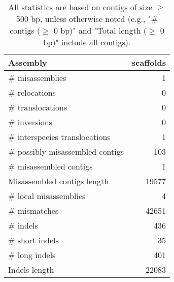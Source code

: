 \documentclass[12pt,a4paper]{article}
\begin{document}
\begin{table}[ht]
\begin{center}
\caption{All statistics are based on contigs of size $\geq$ 500 bp, unless otherwise noted (e.g., "\# contigs ($\geq$ 0 bp)" and "Total length ($\geq$ 0 bp)" include all contigs).}
\begin{tabular}{|l*{1}{|r}|}
\hline
Assembly & scaffolds \\ \hline
\# misassemblies & 1 \\ \hline
\hspace{5mm}\# relocations & 0 \\ \hline
\hspace{5mm}\# translocations & 0 \\ \hline
\hspace{5mm}\# inversions & 0 \\ \hline
\hspace{5mm}\# interspecies translocations & 1 \\ \hline
\# possibly misassembled contigs & 103 \\ \hline
\# misassembled contigs & 1 \\ \hline
Misassembled contigs length & 19577 \\ \hline
\# local misassemblies & 4 \\ \hline
\# mismatches & 42651 \\ \hline
\# indels & 436 \\ \hline
\hspace{5mm}\# short indels & 35 \\ \hline
\hspace{5mm}\# long indels & 401 \\ \hline
Indels length & 22083 \\ \hline
\end{tabular}
\end{center}
\end{table}
\end{document}
